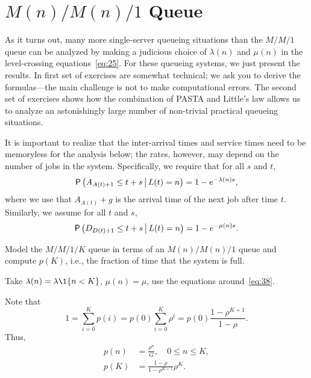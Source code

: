 \documentclass[companion]{subfiles}
\begin{document}
\section{$M(n)/M(n)/1$ Queue}
\label{sec:mnmn1}

As it turns out, many more single-server queueing situations than the $M/M/1$ queue can be analyzed by making a judicious choice of $\lambda(n)$ and $\mu(n)$ in the level-crossing equations~\cref{eq:25}.
For these queueing systems, we just present the results.
In first set of exercises are somewhat technical; we ask you to derive the formulas---the main challenge is not to make computational errors.
The second set of exercises shows how the combination of PASTA and Little's law allows us to analyze an astonishingly large number of non-trivial practical queueing situations.



It is important to realize that the inter-arrival times and service times need to be memoryless for the analysis below; the rates, however, may depend on the number of jobs in the system. Specifically, we require that for all $s$ and $t$,
\begin{equation*}
 \P{A_{A(t)+1} \leq t+s \given L(t) = n} = 1-e^{-\lambda(n) s},
\end{equation*}
where we use that $A_{A(t)}+g$ is the arrival time of the next job after time $t$.
Similarly, we assume for all $t$ and $s$,
\begin{equation*}
 \P{D_{D(t)+1} \leq t+s \given L(t)=n} = 1-e^{-\mu(n) s}.
\end{equation*}


\begin{exercise}
 Model the $M/M/1/K$ queue in terms of an $M(n)/M(n)/1$ queue and compute $p(K)$, i.e., the fraction of time that the system is full.
\begin{hint}
 Take $\lambda(n) = \lambda \1{n < K}$, $\mu(n) = \mu$, use the equations around~\cref{eq:38}.
\end{hint}
\begin{solution}
Note that 
\begin{equation*}
1 = \sum_{i=0}^K p(i) = p(0)\sum_{i=0}^K \rho^i = p(0) \frac{1-\rho^{K+1}}{1-\rho}. 
\end{equation*}
Thus,
\begin{subequations}\label{eq:8}
 \begin{align}
p(n) &= \frac{\rho^n}G, \quad 0\leq n \leq K,\\
p(K) &= \frac{1-\rho}{1-\rho^{K+1}} \rho^K.
\end{align}
\end{subequations}
\end{solution}
\end{exercise}
\end{document}
